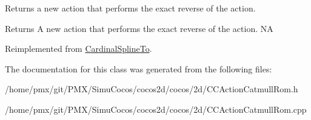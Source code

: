 Returns a new action that performs the exact reverse of the action.

\begin{DoxyReturn}{Returns}
A new action that performs the exact reverse of the action.  NA 
\end{DoxyReturn}


Reimplemented from \hyperlink{classCardinalSplineTo_aecb2ad46af2d58995820c9dfc1f6459f}{Cardinal\+Spline\+To}.



The documentation for this class was generated from the following files\+:\begin{DoxyCompactItemize}
\item 
/home/pmx/git/\+P\+M\+X/\+Simu\+Cocos/cocos2d/cocos/2d/C\+C\+Action\+Catmull\+Rom.\+h\item 
/home/pmx/git/\+P\+M\+X/\+Simu\+Cocos/cocos2d/cocos/2d/C\+C\+Action\+Catmull\+Rom.\+cpp\end{DoxyCompactItemize}
